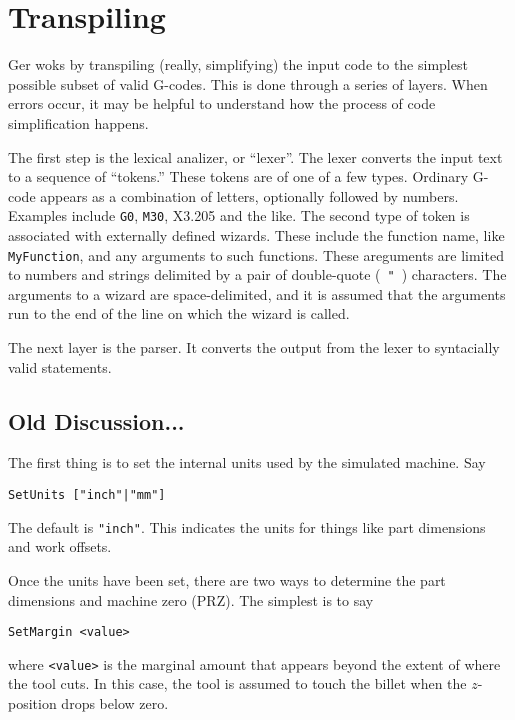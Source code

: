 \documentclass[titlepage,oneside,10pt]{article}
\begin{document}
\section{Transpiling}

Ger woks by transpiling (really, simplifying) the input code to
the simplest possible subset of valid G-codes. This is done through a
series of layers. When errors occur, it may be helpful to
understand how the process of code simplification happens.

The first step is the lexical analizer, or ``lexer''. The lexer
converts the input text to a sequence of ``tokens.'' These tokens are
of one of a few types. Ordinary G-code appears as a combination of
letters, optionally followed by numbers. Examples include {\tt G0},
{\tt M30}, {X3.205} and the like. The second type of token is
associated with externally defined wizards. These include the
function name, like {\tt MyFunction}, and any arguments to such
functions. These areguments are limited to numbers and strings
delimited by a pair of double-quote (\ {\tt "}\ ) characters. The
arguments to a wizard are space-delimited, and it is assumed that
the arguments run to the end of the line on which the wizard is
called.

The next layer is the parser. It converts the output from the lexer to
syntacially valid statements. 


\vskip 2cm 



\pagebreak

\subsection{Old Discussion...}

The first thing is to set the internal units used by the simulated
machine. Say
\begin{verbatim}
SetUnits ["inch"|"mm"]
\end{verbatim}
The default is {\tt "inch"}. This indicates the units for things like
part dimensions and work offsets.

Once the units have been set, there are two ways to determine the part
dimensions and machine zero (PRZ). The simplest is to say
\begin{verbatim}
SetMargin <value>
\end{verbatim}
where {\tt <value>} is the marginal amount that appears beyond the
extent of where the tool cuts. In this case, the tool is assumed to
touch the billet when the $z$-position drops below zero.
\end{document}
